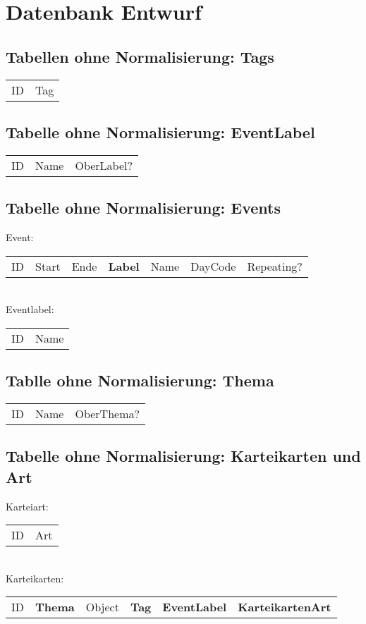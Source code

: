 \documentclass[
a4paper,
twoside,
DIV=12,
BCOR=8mm,
headlineinclude=true,
footinclude=false,
numbers=noenddot,
headheight=40pt, 11pt]{scrartcl}
\begin{document}
	\section*{Datenbank Entwurf}
	\subsection[Tags]{Tabellen ohne Normalisierung: Tags}
	\begin{tabular} {|c| c|}
		ID & Tag  \\
	\end{tabular} 
	\subsection[Label]{Tabelle ohne Normalisierung: EventLabel}
	\begin{tabular}{|c| c| c|}
		ID & Name & OberLabel? \\
	\end{tabular}
	\subsection[Events]{Tabelle ohne Normalisierung: Events}
	Event:
	\begin{tabular}{|c| c| c |c |c |c|c|}
		ID & Start & Ende& \textbf{Label}& Name & DayCode & Repeating? 
	\end{tabular}\\ Eventlabel:
	 \begin{tabular}{|c |c|}
	 	ID & Name
	 \end{tabular}
 	\subsection[Thema]{Tablle ohne Normalisierung: Thema}
 	\begin{tabular}{|c| c| c|}
 		ID & Name & OberThema?
 	\end{tabular}
 	\subsection[Karteikarte]{Tabelle ohne Normalisierung: Karteikarten und Art} Karteiart:
 	\begin{tabular}{c |c |}
 		ID & Art
 	\end{tabular} \\ Karteikarten:
 	\begin{tabular}{|c| c| c| c| c| c|}
 		ID & \textbf{Thema} & Object & \textbf{Tag} & \textbf{EventLabel} & \textbf{KarteikartenArt} 
 	\end{tabular}
\end{document}
